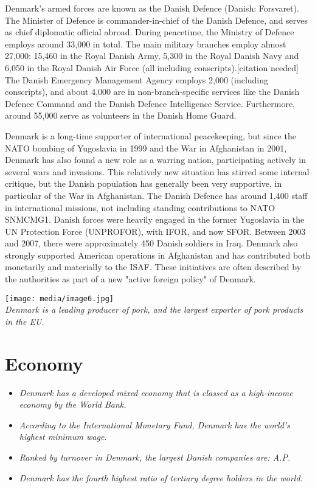 Denmark's armed forces are known as the Danish Defence (Danish:
Forsvaret). The Minister of Defence is commander-in-chief of the Danish
Defence, and serves as chief diplomatic official abroad. During
peacetime, the Ministry of Defence employs around 33,000 in total. The
main military branches employ almost 27,000: 15,460 in the Royal Danish
Army, 5,300 in the Royal Danish Navy and 6,050 in the Royal Danish Air
Force (all including conscripts).{[}citation needed{]} The Danish
Emergency Management Agency employs 2,000 (including conscripts), and
about 4,000 are in non-branch-specific services like the Danish Defence
Command and the Danish Defence Intelligence Service. Furthermore, around
55,000 serve as volunteers in the Danish Home Guard.

Denmark is a long-time supporter of international peacekeeping, but
since the NATO bombing of Yugoslavia in 1999 and the War in Afghanistan
in 2001, Denmark has also found a new role as a warring nation,
participating actively in several wars and invasions. This relatively
new situation has stirred some internal critique, but the Danish
population has generally been very supportive, in particular of the War
in Afghanistan. The Danish Defence has around 1,400 staff in
international missions, not including standing contributions to NATO
SNMCMG1. Danish forces were heavily engaged in the former Yugoslavia in
the UN Protection Force (UNPROFOR), with IFOR, and now SFOR. Between
2003 and 2007, there were approximately 450 Danish soldiers in Iraq.
Denmark also strongly supported American operations in Afghanistan and
has contributed both monetarily and materially to the ISAF. These
initiatives are often described by the authorities as part of a new
"active foreign policy" of Denmark.

\texttt{[image: media/image6.jpg]}\\
\emph{Denmark is a leading producer of pork, and the largest exporter of
pork products in the EU.}

\section{Economy}\label{economy}

\begin{itemize}
\item
  \emph{Denmark has a developed mixed economy that is classed as a
  high-income economy by the World Bank.}
\item
  \emph{According to the International Monetary Fund, Denmark has the
  world's highest minimum wage.}
\item
  \emph{Ranked by turnover in Denmark, the largest Danish companies are:
  A.P.}
\item
  \emph{Denmark has the fourth highest ratio of tertiary degree holders
  in the world.}
\end{itemize}

